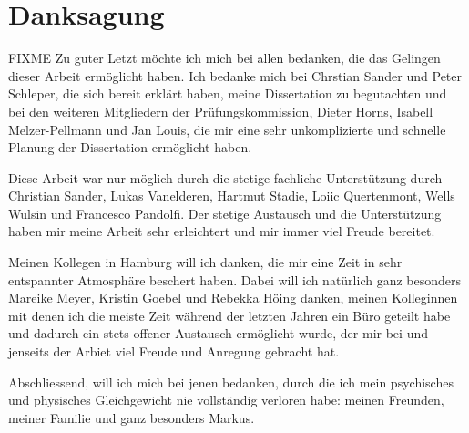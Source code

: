 \chapter*{Danksagung}
\vspace{1cm}
FIXME
Zu guter Letzt möchte ich mich bei allen bedanken, die das Gelingen dieser Arbeit ermöglicht haben.
Ich bedanke mich bei Chrstian Sander und Peter Schleper, die sich bereit erklärt haben, meine Dissertation zu begutachten und bei den  weiteren Mitgliedern der Prüfungskommission, Dieter Horns, Isabell Melzer-Pellmann und Jan Louis, die mir eine sehr unkomplizierte und schnelle Planung der Dissertation ermöglicht haben.

Diese Arbeit war nur möglich durch die stetige fachliche Unterstützung durch Christian Sander, Lukas Vanelderen, Hartmut Stadie, Loiic Quertenmont, Wells Wulsin und Francesco Pandolfi.
Der stetige Austausch und die Unterstützung haben mir meine Arbeit sehr erleichtert und mir immer viel Freude bereitet.

Meinen Kollegen in Hamburg will ich danken, die mir eine Zeit in sehr entspannter Atmosphäre beschert haben.
Dabei will ich natürlich ganz besonders Mareike Meyer, Kristin Goebel und Rebekka Höing danken, meinen Kolleginnen mit denen ich die meiste Zeit während der letzten Jahren ein Büro geteilt habe und dadurch ein stets offener Austausch ermöglicht wurde, der mir bei und jenseits der Arbiet viel Freude und Anregung gebracht hat.    

Abschliessend, will ich mich bei jenen bedanken, durch die ich mein psychisches und physisches Gleichgewicht nie vollständig verloren habe: meinen Freunden, meiner Familie und ganz besonders Markus.  
